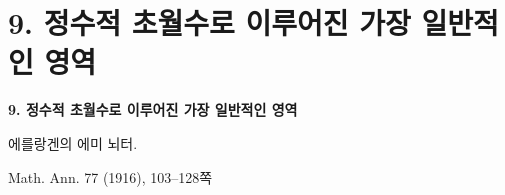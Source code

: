 
\section*{9. 정수적 초월수로 이루어진 가장 일반적인 영역}
\begin{center}
{\Large\bfseries 9. 정수적 초월수로 이루어진 가장 일반적인 영역}\par
\vspace{0.75em}
에를랑겐의 에미 뇌터.\par
\vspace{1.2em}
Math. Ann. 77 (1916), 103--128쪽
\end{center}
